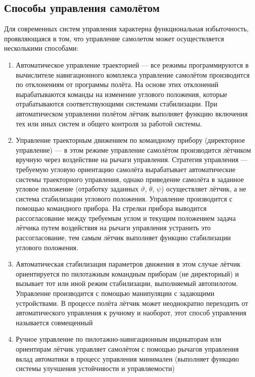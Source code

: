 \documentclass{article}
\begin{document}
\subsection{Способы управления самолётом}
Для современных систем управления характерна функциональная избыточность,
проявляющаяся в том, что управление самолетом может осуществляется несколькими
способами:
\begin{enumerate}
	\item Автоматическое управление траекторией --- все режимы программируются
	      в вычислителе навигационного комплекса управление самолётом
	      производится по отклонениям от программы полёта. На основе этих
	      отклонений вырабатываются команды на изменение углового положения,
	      которые отрабатываются соответствующими системами стабилизации. При
	      автоматическом управлении полётом лётчик выполняет функцию включения
	      тех или иных систем и общего контроля за работой системы.
	\item Управление траекторным движением по командному прибору (директорное
	      управление) --- в этом режиме управление самолётом производится
	      лётчиком вручную через воздействие на рычаги управления. Стратегия
	      управления --- требуемую угловую ориентацию самолёта вырабатывает
	      автоматические системы траекторного управления, однако приведение
	      самолёта в заданное угловое положение (отработку заданных $\vartheta$,
	      $\theta$, $\psi$) осуществляет лётчик, а не система стабилизации
	      углового положения. Управление производится с помощью командного
	      прибора. На стрелки прибора выводится рассогласование между требуемым
	      углом и текущим положением задача лётчика путем воздействия на рычаги
	      управления устранить это рассогласование, тем самым лётчик выполняет
	      функцию стабилизации углового положения.
	\item Автоматическая стабилизация параметров движения в этом случае лётчик
	      ориентируется по пилотажным командным приборам (не директорный) и
	      вызывает тот или иной режим стабилизации, выполняемый автопилотом.
	      Управление производится с помощью манипуляции с задающими устройствами.
	      В процессе полёта лётчик может неоднократно переходить от
	      автоматического управления к ручному и наоборот, этот способ управления
	      называется совмещенный
	\item Ручное управление по пилотажно-навигационным индикаторам или
	      ориентирам лётчик управляет самолётом с помощью рычагов управления
	      вклад автоматики в процесс управления минимален (выполняет функцию
	      системы улучшения устойчивости и управляемости)
\end{enumerate}
\end{document}
